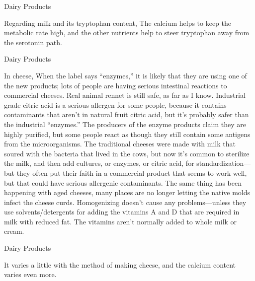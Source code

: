 \documentclass[11pt,oneside,openany,extrafontsizes]{memoir}
\begin{document}
\begin{standalonequote}{Dairy Products}

    \begin{answer}
        Regarding milk and its tryptophan content, The calcium helps to keep the metabolic rate high, and the other nutrients help to steer tryptophan away from the serotonin path.
    \end{answer}
\end{standalonequote}

\begin{standalonequote}{Dairy Products}

    \begin{answer}
        In cheese, When the label says \enquote{enzymes,} it is likely that they are using one of the new products; lots of people are having serious intestinal reactions to commercial cheeses. Real animal rennet is still safe, as far as I know. Industrial grade citric acid is a serious allergen for some people, because it contains contaminants that aren't in natural fruit citric acid, but it's probably safer than the industrial \enquote{enzymes.} The producers of the enzyme products claim they are highly purified, but some people react as though they still contain some antigens from the microorganisms. The traditional cheeses were made with milk that soured with the bacteria that lived in the cows, but now it's common to sterilize the milk, and then add cultures, or enzymes, or citric acid, for standardization---but they often put their faith in a commercial product that seems to work well, but that could have serious allergenic contaminants. The same thing has been happening with aged cheeses, many places are no longer letting the native molds infect the cheese curds. Homogenizing doesn't cause any problems---unless they use solvents/detergents for adding the vitamins A and D that are required in milk with reduced fat. The vitamins aren't normally added to whole milk or cream.
    \end{answer}
\end{standalonequote}

\begin{standalonequote}{Dairy Products}

    \begin{answer}
        It varies a little with the method of making cheese, and the calcium content varies even more.
    \end{answer}
\end{standalonequote}
\end{document}
